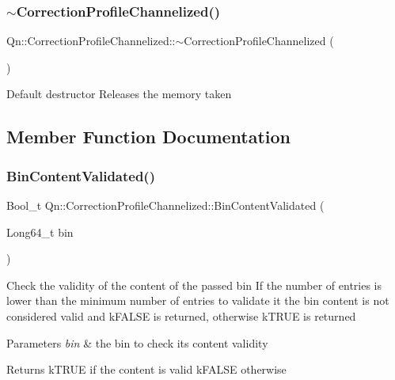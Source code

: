 \subsubsection{\texorpdfstring{$\sim$\+Correction\+Profile\+Channelized()}{~CorrectionProfileChannelized()}}
{\footnotesize\ttfamily Qn\+::\+Correction\+Profile\+Channelized\+::$\sim$\+Correction\+Profile\+Channelized (\begin{DoxyParamCaption}{ }\end{DoxyParamCaption})\hspace{0.3cm}{\ttfamily [virtual]}}

Default destructor Releases the memory taken 

\subsection{Member Function Documentation}
\mbox{\label{classQn_1_1CorrectionProfileChannelized_a1a7640ed888a3357d28f3f0f8e8b4bec}} 
\subsubsection{\texorpdfstring{Bin\+Content\+Validated()}{BinContentValidated()}}
{\footnotesize\ttfamily Bool\+\_\+t Qn\+::\+Correction\+Profile\+Channelized\+::\+Bin\+Content\+Validated (\begin{DoxyParamCaption}\item[{Long64\+\_\+t}]{bin }\end{DoxyParamCaption})\hspace{0.3cm}{\ttfamily [virtual]}}

Check the validity of the content of the passed bin If the number of entries is lower than the minimum number of entries to validate it the bin content is not considered valid and k\+F\+A\+L\+SE is returned, otherwise k\+T\+R\+UE is returned 
\begin{DoxyParams}{Parameters}
{\em bin} & the bin to check its content validity \\
\hline
\end{DoxyParams}
\begin{DoxyReturn}{Returns}
k\+T\+R\+UE if the content is valid k\+F\+A\+L\+SE otherwise 
\end{DoxyReturn}


